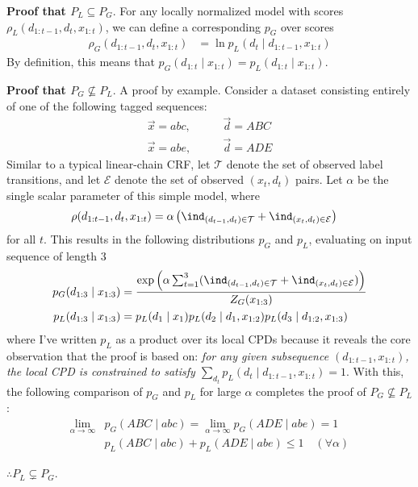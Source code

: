\documentclass[11pt]{article}
\begin{document}
\begin{example}
	\textbf{Proof that $P_L \subseteq P_G$}. For any locally normalized model with scores $\rho_L(d_{1:t-1}, d_{t}, x_{1:t})$, we can define a corresponding $p_G$ over scores
	\begin{align}
	\rho_G(d_{1:t-1}, d_t, x_{1:t}) 
	&= \ln p_L(d_t \mid d_{1:t-1}, x_{1:t}) 
	\end{align}
	By definition, this means that $p_G(d_{1:t} \mid x_{1:t}) = p_L(d_{1:t} \mid x_{1:t})$. 
	
	\textbf{Proof that $P_G \nsubseteq P_L$}. A proof by example. Consider a dataset consisting entirely of one of the following tagged sequences:
	\begin{align}
	\vec{x} = abc, &\qquad \vec{d} = ABC \\
	\vec{x} = abe, &\qquad \vec{d} = ADE  
	\end{align}
	Similar to a typical linear-chain CRF, let $\mathcal{T}$ denote the set of observed label transitions, and let $\mathcal{E}$ denote the set of observed $(x_t, d_t)$ pairs. Let $\alpha$ be the single scalar parameter of this simple model, where
	\begin{align}
	\rho(d_{1:t-1}, d_t, x_{1:t})
	&= \alpha \left( \ind_{(d_{t-1}, d_t) \in \mathcal T}
	+ \ind_{(x_t, d_t) \in \mathcal E} \right)
	\end{align}
	for all $t$. This results in the following distributions $p_G$ and $p_L$, evaluating on input sequence of length $3$
	\begin{align}
	p_G(d_{1:3} \mid x_{1:3})
	&= \frac{
		\exp\left( \alpha \sum_{t=1}^{3} ( \ind_{(d_{t-1}, d_t) \in \mathcal T}
		+ \ind_{(x_t, d_t) \in \mathcal E} )  \right)
	}{
		Z_G(x_{1:3})
	} \\
	p_L(d_{1:3} \mid x_{1:3})
	&= p_L(d_1 \mid x_1) p_L(d_2 \mid d_1, x_{1:2})  p_L(d_3 \mid d_{1:2}, x_{1:3})
	\end{align}
	where I've written $p_L$ as a product over its local CPDs because it reveals the core observation that the proof is based on: \textit{for any given subsequence $(d_{1:t-1}, x_{1:t})$, the local CPD is constrained to satisfy $\sum_{d_t} p_L(d_t \mid d_{1:t-1}, x_{1:t}) = 1$}. With this, the following comparison of $p_G$ and $p_L$ for large $\alpha$ completes the proof of $P_G \nsubseteq P_L$:
	\begin{align}
	\lim_{\alpha \rightarrow \infty} &p_G(ABC \mid abc) 
	= \lim_{\alpha \rightarrow \infty} p_G(ADE \mid abe) = 1 \\
	&p_L(ABC \mid abc) + p_L(ADE \mid abe)  \le 1 \quad (\forall \alpha) 
	\end{align}
	
	$\therefore P_L \subsetneq P_G$.
\end{example}
\end{document}
